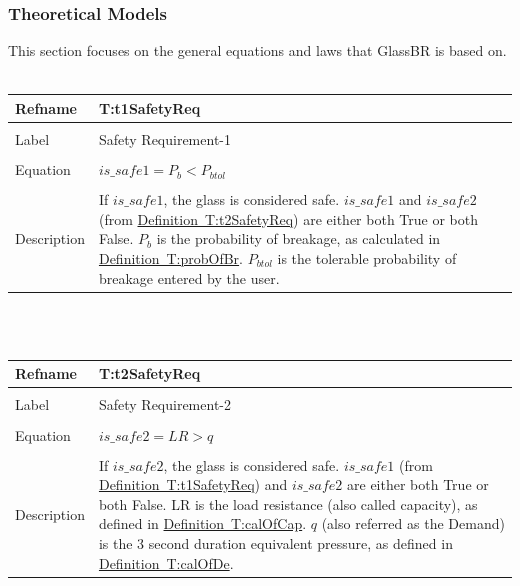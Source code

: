\documentclass[12pt]{article}
\begin{document}
\subsubsection{Theoretical Models}
\label{Sec:TheoMode}
This section focuses on the general equations and laws that GlassBR is based on.
~\newline
\noindent \begin{minipage}{\textwidth}
\begin{tabular}{p{} p{}}
\toprule \textbf{Refname} & \textbf{T:t1SafetyReq}
\label{T:t1SafetyReq}
\\ \midrule \\
Label & Safety Requirement-1
\\ \midrule \\
Equation & $is\_safe1={P_{b}}<{P_{btol}}$
\\ \midrule \\
Description & If $is\_safe1$, the glass is considered safe. $is\_safe1$ and $is\_safe2$ (from \hyperref[T:t2SafetyReq]{Definition~T:t2SafetyReq}) are either both True or both False. ${P_{b}}$ is the probability of breakage, as calculated in \hyperref[T:probOfBr]{Definition~T:probOfBr}. ${P_{btol}}$ is the tolerable probability of breakage entered by the user.
\\ \bottomrule \end{tabular}
\end{minipage}\\
~\newline
\noindent \begin{minipage}{\textwidth}
\begin{tabular}{p{} p{}}
\toprule \textbf{Refname} & \textbf{T:t2SafetyReq}
\label{T:t2SafetyReq}
\\ \midrule \\
Label & Safety Requirement-2
\\ \midrule \\
Equation & $is\_safe2=LR>q$
\\ \midrule \\
Description & If $is\_safe2$, the glass is considered safe. $is\_safe1$ (from \hyperref[T:t1SafetyReq]{Definition~T:t1SafetyReq}) and $is\_safe2$ are either both True or both False. LR is the load resistance (also called capacity), as defined in \hyperref[T:calOfCap]{Definition~T:calOfCap}. $q$ (also referred as the Demand) is the 3 second duration equivalent pressure, as defined in \hyperref[T:calOfDe]{Definition~T:calOfDe}.
\\ \bottomrule \end{tabular}
\end{minipage}\\
\end{document}
